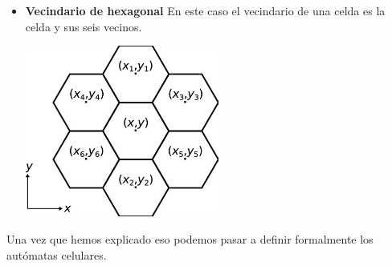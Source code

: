 \begin{itemize}
\begin{minipage}
            \end{minipage}
        \item
            \begin{minipage}
                {0.5\textwidth}
                \textbf{Vecindario de hexagonal} En este caso el vecindario de una celda es la celda y sus seis vecinos.
            \end{minipage}
            \begin{minipage}
                {0.5\textwidth}
                \centering
                \includegraphics[width=0.5\textwidth]{./images/marco_teorico/automatas_celulares/hexN.jpg}
            \end{minipage}
    \end{itemize}
    \vskip 0.5cm
    Una vez que hemos explicado eso podemos pasar a definir formalmente los aut\'omatas celulares.
    \vskip 0.5cm